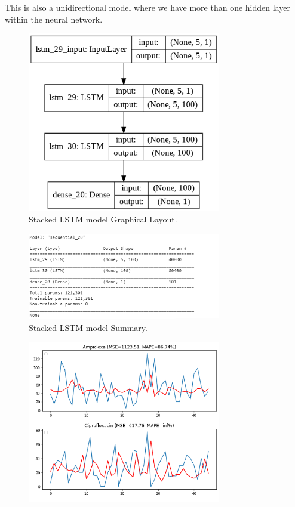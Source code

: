 \documentclass[12pt]{report}
\begin{document}
This is also a unidirectional model where we have more than one hidden layer within the neural network.
\begin{figure}[H]%
\begin {center}
\includegraphics[width=0.75\textwidth]{StackedLstm.png}
\caption{Stacked LSTM model Graphical Layout.}
\label{fig:ecg}
\end {center}
\end{figure}

\begin{figure}[H]%
\begin {center}
\includegraphics[width=0.75\textwidth]{StackedLstm1.png}
\caption{Stacked LSTM model Summary.}
\label{fig:ecg}
\end {center}
\end{figure}


\begin{figure}[H]%
\begin {center}
\includegraphics[width=0.75\textwidth]{images/stacked (3).png}
\label{fig:ecg}
\end {center}
\end{figure}
\end{document}
